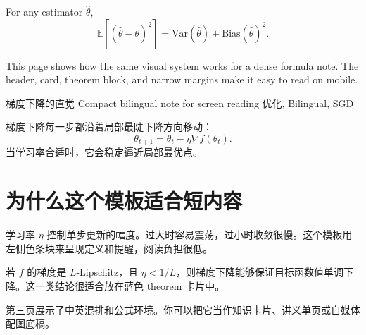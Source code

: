 \documentclass[12pt]{article}
\begin{document}
\begin{Theorem}
For any estimator $\hat{\theta}$,
\[
\mathbb{E}\left[(\hat{\theta}-\theta)^2\right]=\mathrm{Var}(\hat{\theta})+\mathrm{Bias}(\hat{\theta})^2.
\]
\end{Theorem}

\begin{Takeaway}
This page shows how the same visual system works for a dense formula note. The header, card, theorem block, and narrow margins make it easy to read on mobile.
\end{Takeaway}

\newpage

\MakeShortHeader
  {梯度下降的直觉}
  {Compact bilingual note for screen reading}
  {优化, Bilingual, SGD}

\begin{KeyBox}
梯度下降每一步都沿着局部最陡下降方向移动：
\[
\theta_{t+1}=\theta_t-\eta \nabla f(\theta_t).
\]
当学习率合适时，它会稳定逼近局部最优点。
\end{KeyBox}

\section{为什么这个模板适合短内容}

\begin{Definition}[学习率]
学习率 $\eta$ 控制单步更新的幅度。过大时容易震荡，过小时收敛很慢。这个模板用左侧色条块来呈现定义和提醒，阅读负担很低。
\end{Definition}

\begin{Theorem}
若 $f$ 的梯度是 $L$-Lipschitz，且 $\eta < 1/L$，则梯度下降能够保证目标函数值单调下降。这一类结论很适合放在蓝色 theorem 卡片中。
\end{Theorem}

\begin{Takeaway}
第三页展示了中英混排和公式环境。你可以把它当作知识卡片、讲义单页或自媒体配图底稿。
\end{Takeaway}
\end{document}
